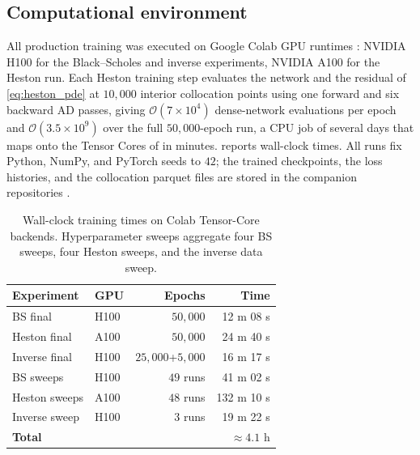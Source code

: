 \subsection{Computational environment}\label{subsec:compute}

All production training was executed on Google Colab GPU runtimes \parencite{google_colab_faq}: NVIDIA H100 \parencite{nvidia_h100,choquette2023nvidia} for the Black--Scholes and inverse experiments, NVIDIA A100 \parencite{nvidia_a100} for the Heston run. Each Heston training step evaluates the network and the residual of \eqref{eq:heston_pde} at $10{,}000$ interior collocation points using one forward and six backward AD passes, giving $\mathcal{O}(7\times 10^4)$ dense-network evaluations per epoch and $\mathcal{O}(3.5\times 10^{9})$ over the full $50{,}000$-epoch run, a CPU job of several days that maps onto the Tensor Cores of \parencite{markidis2018tensor,nvidia_h100} in minutes.  reports wall-clock times. All runs fix Python, NumPy, and PyTorch seeds to $42$; the trained checkpoints, the loss histories, and the collocation parquet files are stored in the companion repositories \parencite{furnes2026fys5429code,furnes2026fys5429overleaf}.

\begin{table}[!htbp]
    \centering
    \footnotesize
    \setlength{\tabcolsep}{4pt}
    \renewcommand{\arraystretch}{1.08}
    \caption{Wall-clock training times on Colab Tensor-Core backends. Hyperparameter sweeps aggregate four BS sweeps, four Heston sweeps, and the inverse data sweep.}
    \label{tab:runtime_summary}
    \begin{tabularx}{\linewidth}{@{} l l r r @{}}
        \toprule
        \textbf{Experiment} & \textbf{GPU} & \textbf{Epochs} & \textbf{Time} \\
        \midrule
        BS final            & H100 & $50{,}000$ & 12 m 08 s \\
        Heston final        & A100 & $50{,}000$ & 24 m 40 s \\
        Inverse final       & H100 & $25{,}000$+$5{,}000$ & 16 m 17 s \\
        BS sweeps           & H100 & $49$ runs & 41 m 02 s \\
        Heston sweeps       & A100 & $48$ runs & 132 m 10 s \\
        Inverse sweep       & H100 & $3$ runs  & 19 m 22 s \\
        \midrule
        \textbf{Total}      &      &           & $\approx 4.1$ h \\
        \bottomrule
    \end{tabularx}
\end{table}
